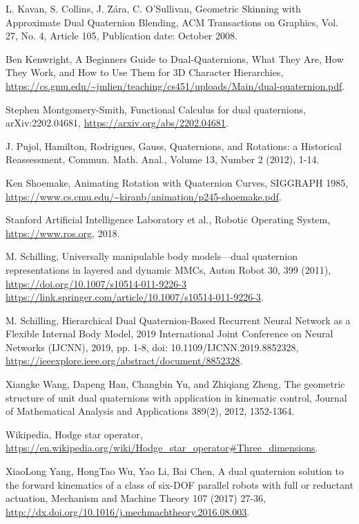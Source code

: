 \documentclass[reqno,12pt]{amsart}
\begin{document}
\begin{thebibliography}{99}
 L. Kavan, S. Collins, J. \u Z\'ara, C. O'Sullivan, Geometric Skinning with Approximate Dual Quaternion Blending, ACM Transactions on Graphics, Vol. 27, No. 4, Article 105, Publication date: October 2008.

 Ben Kenwright, A Beginners Guide to Dual-Quaternions, What They Are, How They Work, and How to Use Them for 3D Character Hierarchies, \url{https://cs.gmu.edu/~jmlien/teaching/cs451/uploads/Main/dual-quaternion.pdf}.

 Stephen Montgomery-Smith, Functional Calculus for dual quaternions, arXiv:2202.04681, \url{https://arxiv.org/abs/2202.04681}.

 J. Pujol, Hamilton, Rodrigues, Gauss, Quaternions, and Rotations: a Historical Reassessment, Commun. Math. Anal., Volume 13, Number 2 (2012), 1-14.

 Ken Shoemake, Animating Rotation with Quaternion Curves, SIGGRAPH 1985, \url{https://www.cs.cmu.edu/~kiranb/animation/p245-shoemake.pdf}.

 Stanford Artificial Intelligence Laboratory et al., Robotic Operating System, \url{https://www.ros.org}, 2018.

  M. Schilling, Universally manipulable body models---dual quaternion representations in layered and dynamic MMCs, Auton Robot 30, 399 (2011), \url{https://doi.org/10.1007/s10514-011-9226-3 https://link.springer.com/article/10.1007/s10514-011-9226-3}.

 M. Schilling, Hierarchical Dual Quaternion-Based Recurrent Neural Network as a Flexible Internal Body Model, 2019 International Joint Conference on Neural Networks (IJCNN), 2019, pp. 1-8, doi: 10.1109/IJCNN.2019.8852328, \url{https://ieeexplore.ieee.org/abstract/document/8852328}.

 Xiangke Wang, Dapeng Han, Changbin Yu, and Zhiqiang Zheng, The geometric structure of unit dual quaternions with application in kinematic control, Journal of Mathematical Analysis and Applications 389(2), 2012, 1352-1364.

 Wikipedia, Hodge star operator, \url{https://en.wikipedia.org/wiki/Hodge_star_operator#Three_dimensions}.

 XiaoLong Yang, HongTao Wu, Yao Li, Bai Chen, A dual quaternion solution to the forward kinematics of a class of six-DOF parallel robots with full or reductant actuation, Mechanism and Machine Theory 107 (2017) 27-36, \url{http://dx.doi.org/10.1016/j.mechmachtheory.2016.08.003}.

\end{thebibliography}
\end{document}
